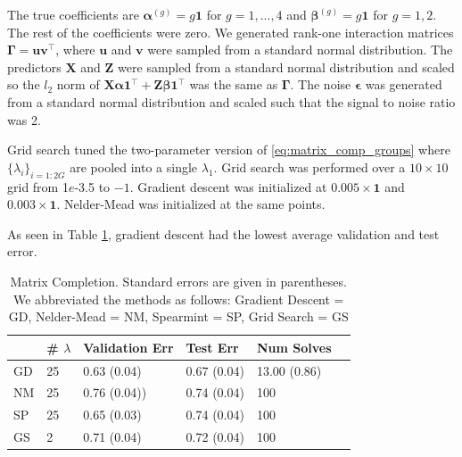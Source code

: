 \documentclass[12pt]{article}
\begin{document}
The true coefficients are $\boldsymbol{\alpha}^{(g)} = g \boldsymbol{1}$ for $g = 1,...,4$ and $\boldsymbol{\beta}^{(g)} = g \boldsymbol{1}$ for $g = 1,2$. The rest of the coefficients were zero. We generated rank-one interaction matrices $\boldsymbol{\Gamma} = \boldsymbol{u}\boldsymbol{v}^\top$, where $\boldsymbol{u}$ and $\boldsymbol{v}$ were sampled from a standard normal distribution. The predictors $\boldsymbol X$ and $\boldsymbol{Z}$ were sampled from a standard normal distribution and scaled so the $l_2$ norm of $\boldsymbol{X}\boldsymbol{\alpha}\boldsymbol{1}^\top + \boldsymbol{Z}\boldsymbol{\beta}\boldsymbol{1}^\top$ was the same as $\boldsymbol{\Gamma}$.
The noise $\boldsymbol \epsilon$ was generated from a standard normal distribution and scaled such that the signal to noise ratio was 2. 


Grid search tuned the two-parameter version of \eqref{eq:matrix_comp_groups} where $\{\lambda_i\}_{i=1:2G}$ are pooled into a single $\lambda_1$. Grid search was performed over a $10 \times 10$ grid from 1$e$-3.5 to $-1$. Gradient descent was initialized at $0.005 \times \boldsymbol 1$ and $0.003 \times \boldsymbol 1$. Nelder-Mead was initialized at the same points.

As seen in Table \ref{table:matrix_completion}, gradient descent had the lowest average validation and test error.

\begin{table}
	\caption{\label{table:matrix_completion} Matrix Completion. Standard errors are given in parentheses. We abbreviated the methods as follows: Gradient Descent = GD, Nelder-Mead = NM, Spearmint = SP, Grid Search = GS}
	\centering
		\begin{tabular}{| l | l | l | l | l | l | }
		\hline
		& \# $\lambda$ & Validation Err & Test Err & Num Solves\\
		\hline
		GD & 25 & 0.63 (0.04) & 0.67 (0.04) & 13.00 (0.86)\\
		\hline
		NM & 25 & 0.76 (0.04)) & 0.74 (0.04) & 100 \\
		\hline
		SP & 25 & 0.65 (0.03) & 0.74 (0.04) & 100\\
		\hline
		GS & 2 & 0.71 (0.04) & 0.72 (0.04) & 100\\
		\hline
	\end{tabular}
\end{table}
\end{document}
